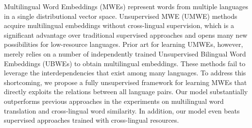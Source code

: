 Multilingual Word Embeddings (MWEs) represent words from multiple languages in a single distributional vector space. Unsupervised MWE (UMWE) methods acquire multilingual embeddings without cross-lingual supervision, which is a significant advantage over traditional supervised approaches and opens many new possibilities for low-resource languages. Prior art for learning UMWEs, however, merely relies on a number of independently trained Unsupervised Bilingual Word Embeddings (UBWEs) to obtain multilingual embeddings. These methods fail to leverage the interdependencies that exist among many languages. To address this shortcoming, we propose a fully unsupervised framework for learning MWEs that directly exploits the relations between all language pairs. Our model substantially outperforms previous approaches in the experiments on multilingual word translation and cross-lingual word similarity. In addition, our model even beats supervised approaches trained with cross-lingual resources.
